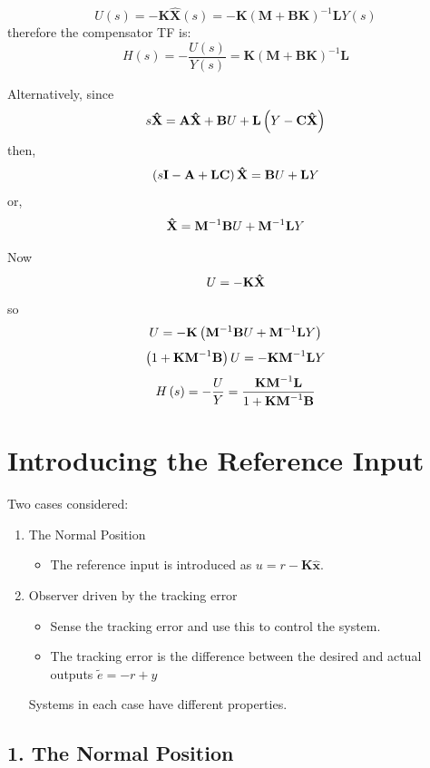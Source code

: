 \[
U(s)=-\mathbf{K}\hat{\mathbf{X}}(s)=-\mathbf{K}(\mathbf{M}+\mathbf{BK})^{-1}\mathbf{L}Y(s)
\]
therefore the compensator TF is:
\[
H(s)=-\frac{U(s)}{Y(s)}=\mathbf{K}(\mathbf{M}+\mathbf{BK})^{-1}\mathbf{L}
\]


Alternatively, since
\[
s{\bf{\hat X}} =  {\bf{A\hat X}} + {\bf{B}}U + {\bf{L}}\left( {Y - {\bf{C\hat X}}} \right)
\]
then,
\[
\left( {s{\bf{I}} - {\bf{A}} + {\bf{LC}}} \right){\bf{\hat X}} = {\bf{B}}U + {\bf{L}}Y 
\]
or,
\[
{\bf{\hat X}} = {\bf{M}}^{ - 1} {\bf{B}}U + {\bf{M}}^{ - 1} {\bf{L}}Y
\]

Now
\[
U =  - {\bf{K\hat X}} 
\]
so
\[
U  =   - {\bf{K}}\left( {{\bf{M}}^{ - 1} {\bf{B}}U + {\bf{M}}^{ - 1} {\bf{L}}Y} \right) 
\]
\[
 \left( {1 + {\bf{KM}}^{ - 1} {\bf{B}}} \right)U =  - {\bf{KM}}^{ - 1} {\bf{L}}Y
\]
\[ 
 H\left( s \right) =  - \frac{U}{Y} = \frac{{{\bf{KM}}^{ - 1} {\bf{L}}}}{{1 + {\bf{KM}}^{ - 1} {\bf{B}}}} 
\]




 
\section*{Introducing the Reference Input} %
\label{sec:introducing_the_reference_input}

\ifslidesonly
\begin{slide}
Two cases considered:
\begin{enumerate}
	\item The Normal Position
	\begin{itemize}
		\item The reference input is introduced as $u=r-\mathbf{K}\hat{\mathbf{x}}$.
	\end{itemize}
	\item Observer driven by the tracking error
	\begin{itemize}
		\item Sense the tracking error and use this to control the system.
		\item The tracking error is the difference between the desired and actual outputs $\tilde e =  - r + y$
	\end{itemize}
	Systems in each case have different properties.
\end{enumerate}
   
\end{slide}
\fi
\subsection*{1. The Normal Position} %
\label{sub:1_the_normal_position}

